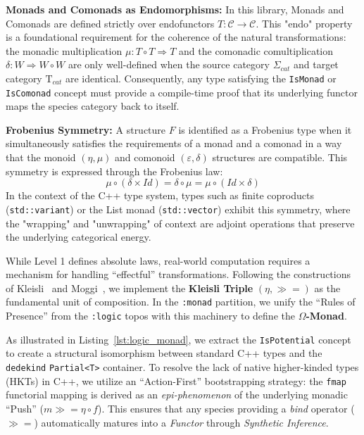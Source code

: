 \documentclass[11pt, a4paper]{report}
\begin{document}
\textbf{Monads and Comonads as Endomorphisms:} In this library, Monads and Comonads are defined strictly over endofunctors $T: \mathcal{C} \to \mathcal{C}$. This "endo" property is a foundational requirement for the coherence of the natural transformations: the monadic multiplication $\mu: T \circ T \Rightarrow T$ and the comonadic comultiplication $\delta: W \Rightarrow W \circ W$ are only well-defined when the source category $\Sigma_{cat}$ and target category $\mathrm{T}_{cat}$ are identical. Consequently, any type satisfying the \texttt{IsMonad} or \texttt{IsComonad} concept must provide a compile-time proof that its underlying functor maps the species category back to itself.

\textbf{Frobenius Symmetry:} A structure $F$ is identified as a Frobenius type when it simultaneously satisfies the requirements of a monad and a comonad in a way that the monoid $(\eta, \mu)$ and comonoid $(\varepsilon, \delta)$ structures are compatible. This symmetry is expressed through the Frobenius law:
\[ \mu \circ ( \delta \times Id ) = \delta \circ \mu = \mu \circ ( Id \times \delta ) \]
In the context of the C++ type system, types such as finite coproducts (\texttt{std::variant}) or the List monad (\texttt{std::vector}) exhibit this symmetry, where the "wrapping" and "unwrapping" of context are adjoint operations that preserve the underlying categorical energy.


While Level 1 defines absolute laws, real-world computation requires a mechanism for handling ``effectful'' transformations. Following the constructions of Kleisli~\cite{kleisli1965every} and Moggi~\cite{moggi1991notions}, we implement the \textbf{Kleisli Triple} $(\eta, \gg=)$ as the fundamental unit of composition. In the \texttt{:monad} partition, we unify the ``Rules of Presence'' from the \texttt{:logic} topos with this machinery to define the \textbf{$\Omega$-Monad}.

As illustrated in Listing~\ref{lst:logic_monad}, we extract the \texttt{IsPotential} concept to create a structural isomorphism between standard C++ types and the \texttt{dedekind} \texttt{Partial<T>} container. To resolve the lack of native higher-kinded types (HKTs) in C++, we utilize an ``Action-First'' bootstrapping strategy: the \texttt{fmap} functorial mapping is derived as an \emph{epi-phenomenon} of the underlying monadic ``Push'' ($m \gg= \eta \circ f$). This ensures that any species providing a \emph{bind} operator ($\gg=$) automatically matures into a \textit{Functor} through \textit{Synthetic Inference}.
\end{document}
